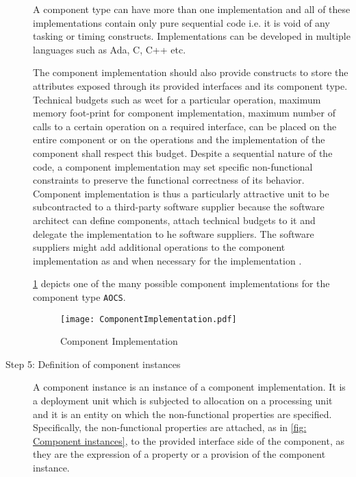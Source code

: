 \begin{description}
A component type can have more than one implementation and all of these implementations contain only pure sequential code i.e. it is void of any tasking or timing constructs. Implementations can be developed in multiple languages such as Ada, C, C++ etc.  

The component implementation should also provide constructs to store the attributes exposed through its provided interfaces and its component type. Technical budgets such as \ac{wcet} for a particular operation, maximum memory foot-print for component implementation, maximum number of calls to a certain operation on a required interface, can be placed on the entire component or on the operations and the implementation of the component shall respect this budget. Despite a sequential nature of the code, a component implementation may set specific non-functional constraints to preserve the functional correctness of its behavior. Component implementation is thus a particularly attractive unit to be subcontracted to a third-party software supplier because the software architect can define components, attach technical budgets to it and delegate the implementation to he software suppliers. The software suppliers might add additional operations to the component implementation as and when necessary for the implementation \cite{CompBasedProcess}. 

\cref{fig: Component implementation} depicts one of the many possible component implementations for the component type \texttt{AOCS}.

\begin{figure}[h]
	\centering
	\texttt{[image: ComponentImplementation.pdf]}
	\caption{Component Implementation}
	\label{fig: Component implementation}
\end{figure} 

\item [Step 5: Definition of component instances] A component instance is an instance of a component implementation. It is a deployment unit which is subjected to allocation on a processing unit and it is an entity on which the non-functional properties are specified. Specifically, the non-functional properties are attached, as in \cref{fig: Component instances}, to the provided interface side of the component, as they are the expression of a property or a provision of the component instance.


\end{description}
